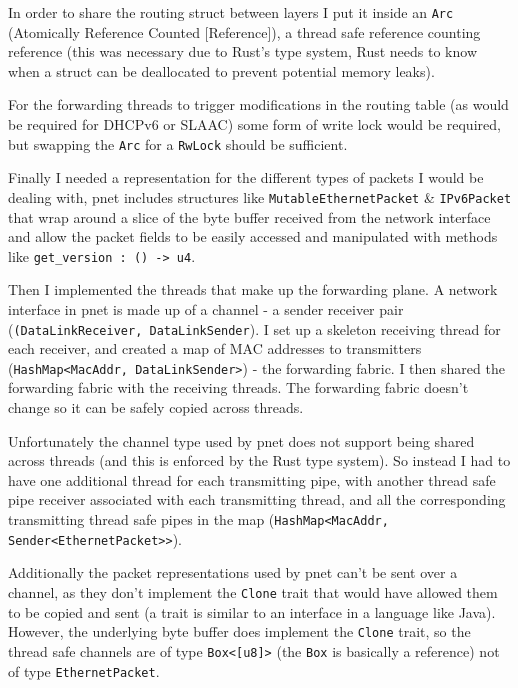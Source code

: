 \documentclass[12pt,a4paper,twoside,openany]{report}
\begin{document}
In order to share the routing struct between layers I put it inside an \verb!Arc! (Atomically Reference Counted [Reference]\cite{rust_arc}), a thread safe reference counting reference (this was necessary due to Rust's type system, Rust needs to know when a struct can be deallocated to prevent potential memory leaks). 

 For the forwarding threads to trigger modifications in the routing table (as would be required for DHCPv6 or SLAAC) some form of write lock would be required, but swapping the \verb!Arc! for a \verb!RwLock!\cite{rust_rwlock} should be sufficient.

Finally I needed a representation for the different types of packets I would be dealing with, pnet\cite{pnet_rust} includes structures like \verb!MutableEthernetPacket! \& \verb!IPv6Packet! that wrap around a slice of the byte buffer received from the network interface and allow the packet fields to be easily accessed and manipulated with methods like \verb!get_version : () -> u4!.

\bigskip

Then I implemented the threads that make up the forwarding plane.  A network interface in pnet is made up of a channel - a sender receiver pair (\verb!(DataLinkReceiver, DataLinkSender!). I set up a skeleton receiving thread for each receiver, and created a map of MAC addresses to transmitters (\verb!HashMap<MacAddr, DataLinkSender>!) - the forwarding fabric.  I then shared the forwarding fabric with the receiving threads. The forwarding fabric doesn't change so it can be safely copied across threads. 

Unfortunately the channel type used by pnet does not support being shared across threads (and this is enforced by the Rust type system).  So instead I had to have one additional thread for each transmitting pipe, with another thread safe pipe receiver associated with each transmitting thread, and all the corresponding transmitting thread safe pipes in the map (\verb!HashMap<MacAddr, Sender<EthernetPacket>>!).

Additionally the packet representations used by pnet can't be sent over a channel, as they don't implement the \verb!Clone! trait that would have allowed them to be copied and sent (a trait is similar to an interface in a language like Java).  However, the underlying byte buffer does implement the \verb!Clone! trait, so the thread safe channels are of type \verb!Box<[u8]>! (the \verb!Box! is basically a reference) not of type \verb!EthernetPacket!. 
\end{document}
